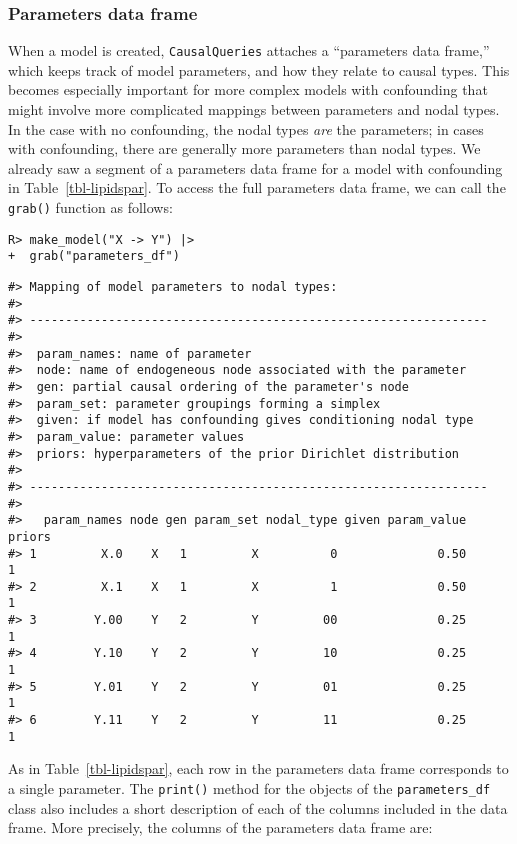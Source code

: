\documentclass[
  11pt,
  article]{jss}
\begin{document}
\subsubsection{Parameters data frame}\label{sec-param-df}

When a model is created, \texttt{CausalQueries} attaches a ``parameters
data frame,'' which keeps track of model parameters, and how they relate
to causal types. This becomes especially important for more complex
models with confounding that might involve more complicated mappings
between parameters and nodal types. In the case with no confounding, the
nodal types \emph{are} the parameters; in cases with confounding, there
are generally more parameters than nodal types. We already saw a segment
of a parameters data frame for a model with confounding in
Table~\ref{tbl-lipidspar}. To access the full parameters data frame, we
can call the \texttt{grab()} function as follows:

\begin{verbatim}
R> make_model("X -> Y") |> 
+  grab("parameters_df") 
\end{verbatim}

\begin{verbatim}
#> Mapping of model parameters to nodal types: 
#> 
#> ----------------------------------------------------------------
#> 
#>  param_names: name of parameter
#>  node: name of endogeneous node associated with the parameter
#>  gen: partial causal ordering of the parameter's node
#>  param_set: parameter groupings forming a simplex
#>  given: if model has confounding gives conditioning nodal type
#>  param_value: parameter values
#>  priors: hyperparameters of the prior Dirichlet distribution 
#> 
#> ----------------------------------------------------------------
#> 
#>   param_names node gen param_set nodal_type given param_value priors
#> 1         X.0    X   1         X          0              0.50      1
#> 2         X.1    X   1         X          1              0.50      1
#> 3        Y.00    Y   2         Y         00              0.25      1
#> 4        Y.10    Y   2         Y         10              0.25      1
#> 5        Y.01    Y   2         Y         01              0.25      1
#> 6        Y.11    Y   2         Y         11              0.25      1
\end{verbatim}

As in Table~\ref{tbl-lipidspar}, each row in the parameters data frame
corresponds to a single parameter. The \texttt{print()} method for the
objects of the \texttt{parameters\_df} class also includes a short
description of each of the columns included in the data frame. More
precisely, the columns of the parameters data frame are:
\end{document}
